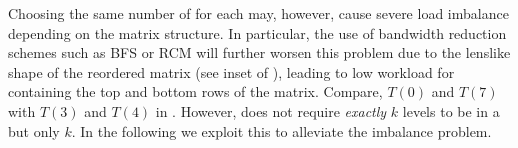 Choosing the same number of \levels for each \levelGroup may,
however, cause severe load imbalance depending on the matrix structure. In
particular, the use of bandwidth reduction schemes such as BFS or RCM
will further worsen this problem due to the lenslike shape of the
reordered matrix (see inset of ), leading to low
workload for \levelGroups containing the top and bottom rows of the
  matrix. Compare, \eg $T(0)$ and $T(7)$ with $T(3)$ and $T(4)$ in
. However,  does not require
\emph{exactly} $k$ levels to be in a \levelGroup but  
only \emph{\atleast} $k$. In
the following we exploit this to alleviate the imbalance
problem.
  
